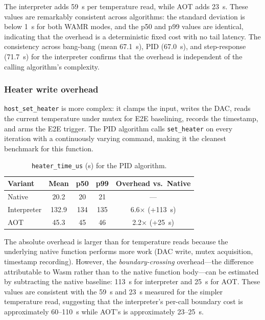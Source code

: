 \documentclass[12pt, a4paper]{report}
\begin{document}
The interpreter adds 59~\textmu{}s per temperature read, while AOT adds 23~\textmu{}s. These values are remarkably consistent across algorithms: the standard deviation is below 1~\textmu{}s for both WAMR modes, and the p50 and p99 values are identical, indicating that the overhead is a deterministic fixed cost with no tail latency. The consistency across bang-bang (mean 67.1~\textmu{}s), PID (67.0~\textmu{}s), and step-response (71.7~\textmu{}s) for the interpreter confirms that the overhead is independent of the calling algorithm's complexity.

\subsubsection{Heater write overhead}
\label{subsec:heater-overhead}

\texttt{host\_set\_heater} is more complex: it clamps the input, writes the DAC, reads the current temperature under mutex for E2E baselining, records the timestamp, and arms the E2E trigger. The PID algorithm calls \texttt{set\_heater} on every iteration with a continuously varying command, making it the cleanest benchmark for this function.

\begin{table}[htbp]
\centering
\caption{\texttt{heater\_time\_us} (\textmu{}s) for the PID algorithm.}
\label{tab:heater-time}
\small
\begin{tabular}{@{}lcccc@{}}
\toprule
\textbf{Variant} & \textbf{Mean} & \textbf{p50} & \textbf{p99} & \textbf{Overhead vs.\ Native} \\
\midrule
Native       & 20.2  & 20  & 21  & --- \\
Interpreter  & 132.9 & 134 & 135 & 6.6$\times$ (+113~\textmu{}s) \\
AOT          & 45.3  & 45  & 46  & 2.2$\times$ (+25~\textmu{}s) \\
\bottomrule
\end{tabular}
\end{table}

The absolute overhead is larger than for temperature reads because the underlying native function performs more work (DAC write, mutex acquisition, timestamp recording). However, the \textit{boundary-crossing} overhead---the difference attributable to Wasm rather than to the native function body---can be estimated by subtracting the native baseline: 113~\textmu{}s for interpreter and 25~\textmu{}s for AOT. These values are consistent with the 59~\textmu{}s and 23~\textmu{}s measured for the simpler temperature read, suggesting that the interpreter's per-call boundary cost is approximately 60--110~\textmu{}s while AOT's is approximately 23--25~\textmu{}s.
\end{document}
